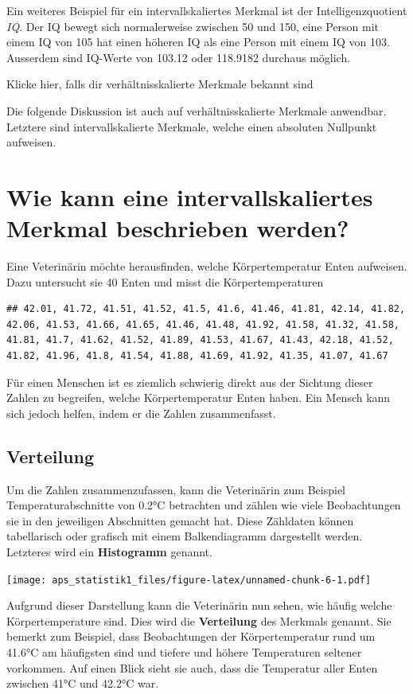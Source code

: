 \documentclass[
]{book}
\begin{document}
Ein weiteres Beispiel für ein intervallskaliertes Merkmal ist der Intelligenzquotient \emph{IQ}. Der IQ bewegt sich normalerweise zwischen 50 und 150, eine Person mit einem IQ von 105 hat einen höheren IQ als eine Person mit einem IQ von 103. Ausserdem sind IQ-Werte von 103.12 oder 118.9182 durchaus möglich.

Klicke hier, falls dir verhältnisskalierte Merkmale bekannt sind

Die folgende Diskussion ist auch auf verhältnisskalierte Merkmale anwendbar. Letztere sind intervallskalierte Merkmale, welche einen absoluten Nullpunkt aufweisen.

\section{Wie kann eine intervallskaliertes Merkmal beschrieben werden?}\label{wie-kann-eine-intervallskaliertes-merkmal-beschrieben-werden}

Eine Veterinärin möchte herausfinden, welche Körpertemperatur Enten aufweisen. Dazu untersucht sie 40 Enten und misst die Körpertemperaturen

\begin{verbatim}
## 42.01, 41.72, 41.51, 41.52, 41.5, 41.6, 41.46, 41.81, 42.14, 41.82, 42.06, 41.53, 41.66, 41.65, 41.46, 41.48, 41.92, 41.58, 41.32, 41.58, 41.81, 41.7, 41.62, 41.52, 41.89, 41.53, 41.67, 41.43, 42.18, 41.52, 41.82, 41.96, 41.8, 41.54, 41.88, 41.69, 41.92, 41.35, 41.07, 41.67
\end{verbatim}

Für einen Menschen ist es ziemlich schwierig direkt aus der Sichtung dieser Zahlen zu begreifen, welche Körpertemperatur Enten haben. Ein Mensch kann sich jedoch helfen, indem er die Zahlen zusammenfasst.

\subsection{Verteilung}\label{verteilung}

Um die Zahlen zusammenzufassen, kann die Veterinärin zum Beispiel Temperaturabschnitte von 0.2°C betrachten und zählen wie viele Beobachtungen sie in den jeweiligen Abschnitten gemacht hat. Diese Zähldaten können tabellarisch oder grafisch mit einem Balkendiagramm dargestellt werden. Letzteres wird ein \textbf{Histogramm} genannt.

\texttt{[image: aps\_statistik1\_files/figure-latex/unnamed-chunk-6-1.pdf]}

Aufgrund dieser Darstellung kann die Veterinärin nun sehen, wie häufig welche Körpertemperature sind. Dies wird die \textbf{Verteilung} des Merkmals genannt. Sie bemerkt zum Beispiel, dass Beobachtungen der Körpertemperatur rund um 41.6°C am häufigsten sind und tiefere und höhere Temperaturen seltener vorkommen. Auf einen Blick sieht sie auch, dass die Temperatur aller Enten zwischen 41°C und 42.2°C war.
\end{document}
